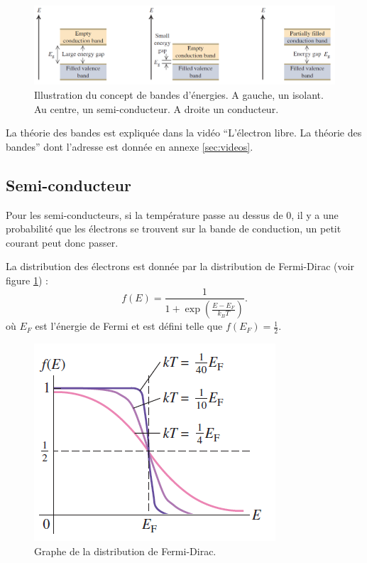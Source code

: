 \begin{figure}[ht]
	\centering
	\includegraphics[scale=0.8]{img/band.png}
	\caption{Illustration du concept de bandes d'énergies.
	A gauche, un isolant. Au centre, un semi-conducteur. A droite
	un conducteur.}
\end{figure}

La théorie des bandes est expliquée dans la vidéo 
``L'électron libre. La théorie des bandes''
dont l'adresse est donnée en annexe \ref{sec:videos}.
\subsection{Semi-conducteur}
Pour les semi-conducteurs,
si la température passe au dessus de \si{0}{\kelvin},
il y a une probabilité que les électrons
se trouvent sur la bande de conduction,
un petit courant peut donc passer.

La distribution des électrons est donnée par la distribution de Fermi-Dirac
(voir figure \ref{fig:fermi-dirac}) :
\[ f(E) = \frac{1}{1+\exp\left(\frac{E-E_F}{k_BT}\right)}. \]
où $E_F$ est l'énergie de Fermi et est défini telle que
$f(E_F) = \frac{1}{2}$.

\begin{figure}[ht]
	\centering
	\includegraphics[scale=0.8]{img/fermi-dirac.png}
	\caption{Graphe de la distribution de Fermi-Dirac.}
	\label{fig:fermi-dirac}
\end{figure}

